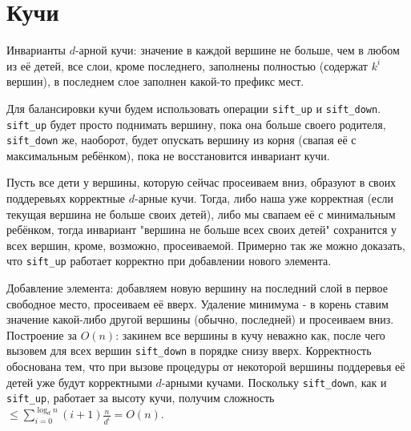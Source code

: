 \section{Кучи}

Инварианты $d$-арной кучи: значение в каждой вершине не больше, чем в любом из её детей, все слои, кроме последнего, заполнены полностью (содержат $k^i$ вершин), в последнем слое заполнен какой-то префикс мест.

Для балансировки кучи будем использовать операции \texttt{sift\_up} и \texttt{sift\_down}. \texttt{sift\_up} будет просто поднимать вершину, пока она больше своего родителя, \texttt{sift\_down} же, наоборот, будет опускать вершину из корня (свапая её с максимальным ребёнком), пока не восстановится инвариант кучи.

Пусть все дети у вершины, которую сейчас просеиваем вниз, образуют в своих поддеревьях корректные $d$-арные кучи. Тогда, либо наша уже корректная (если текущая вершина не больше своих детей), либо мы свапаем её с минимальным ребёнком, тогда инвариант "вершина не больше всех своих детей" сохранится у всех вершин, кроме, возможно, просеиваемой. Примерно так же можно доказать, что \texttt{sift\_up} работает корректно при добавлении нового элемента.

Добавление элемента: добавляем новую вершину на последний слой в первое свободное место, просеиваем её вверх. Удаление минимума - в корень ставим значение какой-либо другой вершины (обычно, последней) и просеиваем вниз. Построение за $O(n)$: закинем все вершины в кучу неважно как, после чего вызовем для всех вершин \texttt{sift\_down} в порядке снизу вверх. Корректность обоснована тем, что при вызове процедуры от некоторой вершины поддеревья её детей уже будут корректными $d$-арными кучами. Поскольку \texttt{sift\_down}, как и \texttt{sift\_up}, работает за высоту кучи, получим сложность $\leq \sum \limits_{i=0}^{\log_{d} n} (i + 1)\frac{n}{d^i} = O(n)$.
